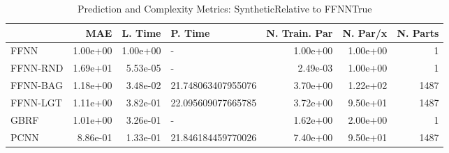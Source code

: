 \begin{table}
\centering
\caption{Prediction and Complexity Metrics: SyntheticRelative to FFNNTrue}
\label{tab__Synthetic__Fix_Neurons_QTrue}
\begin{tabular}{lrrlrrr}
\toprule
{} &      MAE &  L. Time &             P. Time &  N. Train. Par &  N. Par/x &  N. Parts \\
\midrule
FFNN     & 1.00e+00 & 1.00e+00 &                   - &       1.00e+00 &  1.00e+00 &         1 \\
FFNN-RND & 1.69e+01 & 5.53e-05 &                   - &       2.49e-03 &  1.00e+00 &         1 \\
FFNN-BAG & 1.18e+00 & 3.48e-02 &  21.748063407955076 &       3.70e+00 &  1.22e+02 &      1487 \\
FFNN-LGT & 1.11e+00 & 3.82e-01 &  22.095609077665785 &       3.72e+00 &  9.50e+01 &      1487 \\
GBRF     & 1.01e+00 & 3.26e-01 &                   - &       1.62e+00 &  2.00e+00 &         1 \\
PCNN     & 8.86e-01 & 1.33e-01 &  21.846184459770026 &       7.40e+00 &  9.50e+01 &      1487 \\
\bottomrule
\end{tabular}
\end{table}
